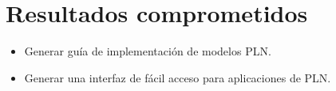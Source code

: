 \section {Resultados comprometidos}
\begin{itemize}
\item Generar guía de implementación de modelos PLN.
\item Generar una interfaz de fácil acceso para aplicaciones de PLN.
\end{itemize}